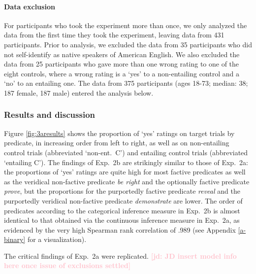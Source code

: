 \documentclass[11pt,fleqn]{article}
\newcommand{\jd}[1]{\textbf{\textcolor{Pink}{[jd: #1]}}}
\newcommand{\6}{\mbox{$[\hspace*{-.6mm}[$}}
\newcommand{\9}{\mbox{$]\hspace*{-.6mm}]$}}
\begin{document}
\paragraph{Data exclusion} For participants who took the experiment more than once, we only analyzed the data from the first time they took the experiment, leaving data from 431 participants. Prior to analysis, we excluded the data from 35 participants who did not self-identify as native speakers of American English. We also excluded the data from 25 participants who gave more than one wrong rating to one of the eight controls, where a wrong rating is a `yes' to a non-entailing control and a `no' to an entailing one. The data from 375 participants (ages 18-73; median: 38; 187 female, 187 male) entered the analysis below. 
    

\subsubsection{Results and discussion}

Figure \ref{fig:3aresults} shows the proportion of `yes' ratings on target trials by predicate, in increasing order from left to right, as well as on non-entailing control trials (abbreviated `non-ent.\ C') and entailing control trials (abbreviated `entailing C'). The findings of Exp.~2b are strikingly similar to those of Exp.~2a: the proportions of `yes' ratings are quite high for most factive predicates as well as the veridical non-factive predicate {\em be right} and the optionally factive predicate \emph{prove}, but the proportions for the purportedly factive predicate {\em reveal} and the purportedly veridical non-factive predicate {\em demonstrate} are lower. The order of predicates according to the categorical inference measure in  Exp.~2b is almost identical to that obtained via the continuous inference measure in Exp.~2a, as evidenced by the very high Spearman rank correlation of .989 (see Appendix \ref{a-binary} for a visualization).

The critical findings of Exp.~2a were replicated.  \jd{JD insert model info here once issue of exclusions settled} 
 
\end{document}
